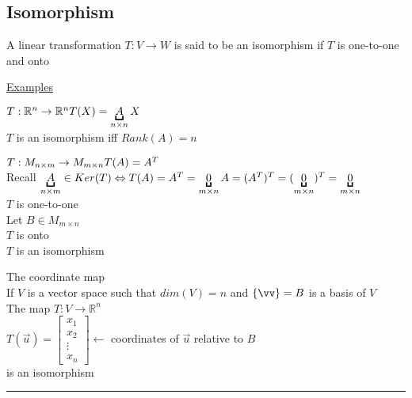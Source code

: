 \documentclass[12pt]{article}
\renewcommand{\v}[1]{\overrightarrow{#1}}
\newcommand\m[1]{\begin{bmatrix}#1\end{bmatrix}}
\newcommand{\real}[0]{\mathbb{R}}
\newenvironment{definition}{\block[Definition]}{\endblock}
\newcommand{\uu}[1]{\underbracket{#1}}
\newenvironment{examples}{\shownto{-,compact}\underline{Examples}\enumerate}{\endenumerate\divider\endshownto}
\newcommand{\bb}[1]{\left\{#1\right\}}
\newcommand{\divider}[0]{\par\textcolor{lightgray}{\rule{\textwidth}{0.1pt}}}
\begin{document}
	\subsection{Isomorphism}
	
	\begin{definition}
		A linear transformation $T: V \rightarrow W$ is said to be an isomorphism if $T$ is one-to-one and onto
	\end{definition}
	
	\begin{examples}
		\item $T: \real^n \rightarrow \real^n \\
		T(X) = \uu{A}_{n \times n} X$ \\
		$T$ is an isomorphism iff $Rank(A) = n$
		\item $T: M_{n \times m} \rightarrow M_{m \times n} \\
		T(A) = A^T$ \\
		Recall $\uu{A}_{n \times m} \in Ker(T) \Leftrightarrow T(A) = A^T = \uu{0}_{m \times n} \\
		A = (A^T)^T = (\uu{0}_{m \times n})^T = \uu{0}_{m \times n}$ \\
		$T$ is one-to-one \\
		Let $B \in M_{m \times n}$ \\
		$T$ is onto \\
		
		$T$ is an isomorphism
		
		\item The coordinate map \\
		If $V$ is a vector space such that $dim(V) = n$ and $\bb{\vv} = B$ is a basis of $V$ \\
		The map $T: V \rightarrow \real^n$ \\
		$T(\v{u}) = \m{x_1 \\ x_2 \\ \vdots \\ x_n} \leftarrow$ coordinates of $\v{u}$ relative to $B$ \\
		is an isomorphism
	\end{examples}
	
\end{document}
